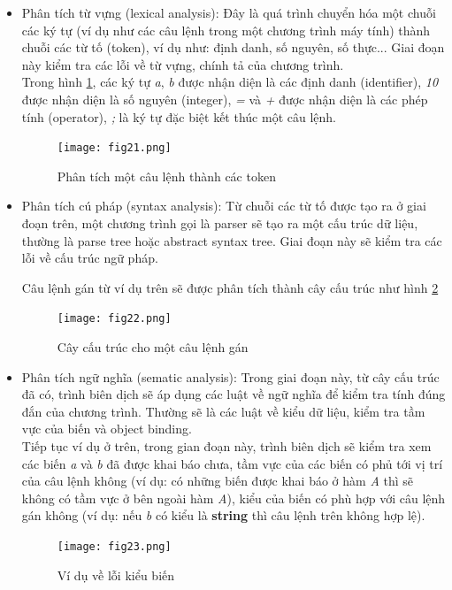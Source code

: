 \begin{itemize}
	\item Phân tích từ vựng (lexical analysis): Đây là quá trình chuyển hóa một chuỗi các ký tự (ví dụ như các câu lệnh trong một chương trình máy tính) thành chuỗi các từ tố (token), ví dụ như: định danh, số nguyên, số thực... Giai đoạn này kiểm tra các lỗi về từ vựng, chính tả của chương trình. \\
	
	Trong hình \ref{fig:lexi}, các ký tự \textit{a}, \textit{b} được nhận diện là các định danh (identifier), \textit{10} được nhận diện là số nguyên (integer), \textit{=} và \textit{+} được nhận diện là các phép tính (operator), \textit{;} là ký tự đặc biệt kết thúc một câu lệnh.
	
	\begin{figure}[h]
		\centering
		\texttt{[image: fig21.png]}
		\caption{Phân tích một câu lệnh thành các token}
		\label{fig:lexi}
	\end{figure}
	
	\item Phân tích cú pháp (syntax analysis): Từ chuỗi các từ tố được tạo ra ở giai đoạn trên, một chương trình gọi là parser sẽ tạo ra một cấu trúc dữ liệu, thường là parse tree hoặc abstract syntax tree. Giai đoạn này sẽ kiểm tra các lỗi về cấu trúc ngữ pháp.
	
	Câu lệnh gán từ ví dụ trên sẽ được phân tích thành cây cấu trúc như hình \ref{fig:parser}
	
	\begin{figure}[h]
		\centering
		\texttt{[image: fig22.png]}
		\caption{Cây cấu trúc cho một câu lệnh gán}
		\label{fig:parser}
	\end{figure}
	
	\item Phân tích ngữ nghĩa (sematic analysis): Trong giai đoạn này, từ cây cấu trúc đã có, trình biên dịch sẽ áp dụng các luật về ngữ nghĩa để kiểm tra tính đúng đắn của chương trình. Thường sẽ là các luật về kiểu dữ liệu, kiểm tra tầm vực của biến và object binding.\\
	Tiếp tục ví dụ ở trên, trong gian đoạn này, trình biên dịch sẽ kiểm tra xem các biến \textit{a} và \textit{b} đã được khai báo chưa, tầm vực của các biến có phủ tới vị trí của câu lệnh không (ví dụ: có những biến được khai báo ở hàm \textit{A} thì sẽ không có tầm vực ở bên ngoài hàm \textit{A}), kiểu của biến có phù hợp với câu lệnh gán không (ví dụ: nếu \textit{b} có kiểu là \textbf{string} thì câu lệnh trên không hợp lệ).
	\begin{figure}[h]
		\centering
		\texttt{[image: fig23.png]}
		\caption{Ví dụ về lỗi kiểu biến}
		\label{fig:semerror}
	\end{figure}
	

\end{itemize}
